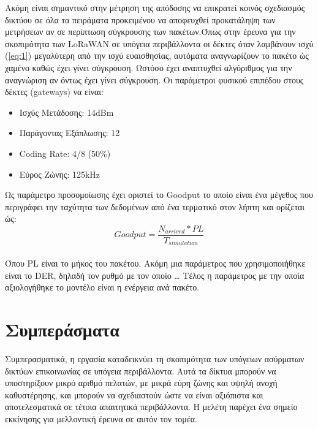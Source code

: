 \documentclass[12pt]{article}
\begin{document}
\begin{multicols*}{2}
        Ακόμη είναι σημαντικό στην μέτρηση της απόδοσης να επικρατεί κοινός
        σχεδιασμός δικτύου σε όλα τα πειράματα προκειμένου να αποφευχθεί προκατάληψη
        των μετρήσεων αν σε περίπτωση σύγκρουσης των πακέτων.Όπως στην έρευνα για την
        σκοπιμότητα των LoRaWAN σε υπόγεια περιβάλλοντα \cite*{zhao_feasibility_2023}
        οι δέκτες όταν λαμβάνουν ισχύ (\ref{eq:1}) μεγαλύτερη από την ισχύ ευαισθησίας,
        αυτόματα αναγνωρίζουν το πακέτο ώς χαμένο καθώς έχει γίνει σύγκρουση. Ωστόσο έχει
        αναπτυχθεί αλγόριθμος για την αναγνώριση αν όντως έχει γίνει σύγκρουση.
        Οι παράμετροι φυσικού επιπέδου στους δέκτες (gateways) να είναι:
        \begin{itemize}
            \item Ισχύς Μετάδοσης: 14dBm
            \item Παράγοντας Εξάπλωσης: 12
            \item Coding Rate: 4/8 (50\%)
            \item Εύρος Ζώνης: 125kHz
        \end{itemize}

        Ως παράμετρο προσομοίωσης έχει οριστεί το Goodput το οποίο είναι ένα μέγεθος
        που περιγράφει την ταχύτητα των δεδομένων από ένα τερματικό στον λήπτη και 
        ορίζεται ώς: 
        \begin{equation}\label{eq:2}
            Goodput = \frac{N_{arrived} * PL}{T_{simulation}}
        \end{equation}\\
        Όπου PL είναι το μήκος του πακέτου.
        Ακόμη μια παράμετρος που χρησιμοποιήθηκε είναι το DER, δηλαδή τον ρυθμό με τον οποίο \dots
        Τέλος η παράμετρος με την οποία αξιολογήθηκε το μοντέλο είναι η ενέργεια ανά πακέτο. 



        

    \section{\normalsize \textbf{Συμπεράσματα}}
        Συμπερασματικά, η εργασία καταδεικνύει τη σκοπιμότητα των
        υπόγειων ασύρματων δικτύων επικοινωνίας σε υπόγεια περιβάλλοντα. Αυτά τα δίκτυα
        μπορούν να υποστηρίξουν μικρό αριθμό πελατών, με μικρά εύρη ζώνης και υψηλή ανοχή
        καθυστέρησης, και μπορούν να σχεδιαστούν ώστε να είναι αξιόπιστα και αποτελεσματικά σε
        τέτοια απαιτητικά περιβάλλοντα. Η μελέτη παρέχει ένα σημείο εκκίνησης για μελλοντική
        έρευνα σε αυτόν τον τομέα.


\end{multicols*}
\end{document}

